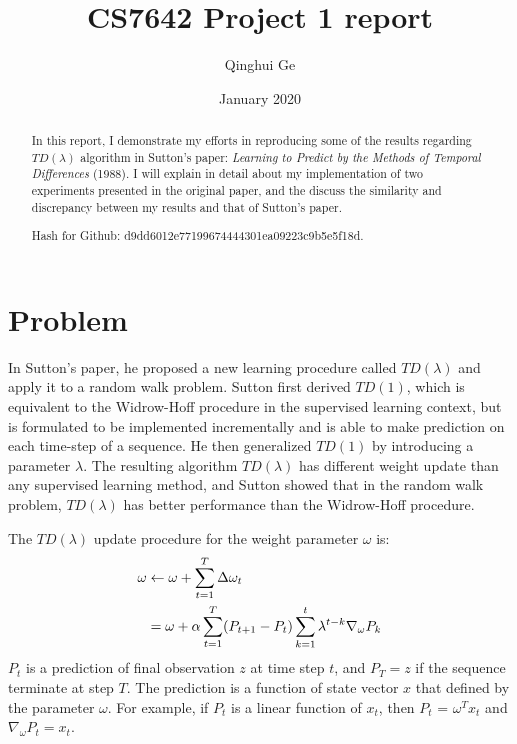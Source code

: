\documentclass[conference]{IEEEtran}
\title{CS7642 Project 1 report}
\author{Qinghui Ge}
\date{January 2020}
\begin{document}
	
	\maketitle
	
	\begin{abstract}
		In this report, I demonstrate my efforts in reproducing some of the results regarding $TD(\lambda)$ algorithm in Sutton's paper: \textit{Learning to Predict by the Methods of Temporal Differences} (1988)\cite{sutton1988learning}. I will explain in detail about my implementation of two experiments presented in the original paper, and the discuss the similarity and discrepancy between my results and that of Sutton's paper.
		
		Hash for Github: d9dd6012e77199674444301ea09223c9b5e5f18d.
	\end{abstract}
	
	\section{Problem}
	In Sutton's paper\cite{sutton1988learning}, he proposed a new learning procedure called $TD(\lambda)$ and apply it to a random walk problem. Sutton first derived $TD(1)$, which is equivalent to the Widrow-Hoff procedure in the supervised learning context, but is formulated to be implemented incrementally and is able to make prediction on each time-step of a sequence. He then generalized $TD(1)$ by introducing a parameter $\lambda$. The resulting algorithm $TD(\lambda)$ has different weight update than any supervised learning method, and Sutton showed that in the random walk problem, $TD(\lambda)$ has better performance than the Widrow-Hoff procedure.
	
	The $TD(\lambda)$ update procedure for the weight parameter $\omega$ is:
	\begin{align}
		\omega &\leftarrow \omega + \sum_{t=1}^{T} {\Delta \omega_t} \notag\\
		&= \omega + \alpha \sum_{t=1}^{T}(P_{t+1} - P_{t})\sum_{k=1}^{t} \lambda^{t-k}\nabla_\omega P_k
		\label{eq:tdlm}
	\end{align}
	$P_t$ is a prediction of final observation $z$ at time step $t$, and $P_{T} = z$ if the sequence terminate at step $T$. The prediction is a function of state vector $x$ that defined by the parameter $\omega$. For example, if $P_t$ is a linear function of $x_t$, then $P_t$ = $\omega^T x_t$ and $\nabla_\omega P_t = x_t$.
	
\end{document}
